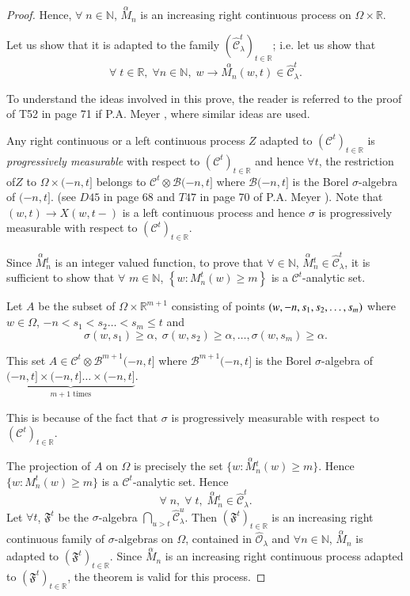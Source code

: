 \begin{proof}
Hence, $\forall \; n \in \mathbb{N}$, $\overset{\alpha}{M}_n$ is an
increasing right continuous process on $\Omega \times \mathbb{R}$. 

Let us show that it is adapted to the family
$(\hat{\mathscr{C}}^t_\lambda)_{t \in \mathbb{R}}$; i.e. let us show
that 
$$
\forall \; t \in \mathbb{R}, \; \forall n \in \mathbb{N}, \; w \to
\overset{\alpha}{M_n} (w,t) \in \hat{\mathscr{C}}^t_\lambda. 
$$

To understand the ideas involved in this prove, the reader is referred
to the proof of T52 in page 71 if P.A. Meyer \cite{key1}, where
similar ideas are used. 

Any right continuous or a left continuous process $Z$ adapted to\break
$(\mathscr{C}^t)_{t \in \mathbb{R}}$ is {\em progressively measurable}
with respect to $(\mathscr{C}^t)_{t \in \mathbb{R}}$ and hence
$\forall t$, the restriction of\pageoriginale $Z$ to $\Omega \times
(-n ,t]$ belongs to $\mathscr{C}^t \otimes \mathscr{B} (-n,t]$ where
  $\mathscr{B}(-n,t]$ is the Borel $\sigma$-algebra of $(-n,t]$. (see
$D45$ in page 68 and $T47$ in page 70 of P.A. Meyer \cite{key1}). Note
that $(w,t) \to X(w,t-)$ is a left continuous process and hence
$\sigma$ is progressively measurable with respect to
$(\mathscr{C}^t)_{t \in \mathbb{R}}$. 

Since $\overset{\alpha}{M} {}^t_n$ is an integer valued function, to
prove that $\forall \in \mathbb{N}$, $\overset{\alpha}{M}{}^t_n \in
\hat{\mathscr{C}}^t_\lambda $, it is sufficient to show that $\forall$
$m \in \mathbb{N}$, $\left\{ w: M^t_n (w) \geq m\right\}$ is a
$\mathscr{C}^t$-analytic set.

Let $A$ be the subset of $\Omega \times \mathbb{R}^{m+1}$ consisting
of points $(w, -n, s_1, s_2,\break\ldots,s_m)$ where $w \in \Omega$, $-n
< s_1 < s_2 \ldots  < s_m \leq t$ and 
$$
\sigma (w, s_1) \geq \alpha, \; \sigma (w, s_2) \geq \alpha, \ldots ,
\sigma (w , s_m) \geq \alpha. 
$$ 

This set $A \in \mathscr{C}^t \otimes \mathscr{B}^{m+1}(-n,t]$  where
$\mathscr{B}^{m+1} (-n,t] $ is the Borel $\sigma$-algebra of
$\underset{m+1 \text{ times}}{\underbrace{(-n,t] \times (-n,t] \ldots
\times (-n, t]}}$.  

This is because of the fact that $\sigma$ is progressively measurable
with respect to $(\mathscr{C}^t)_{t \in \mathbb{R}}$. 

The projection of $A$ on $\Omega$ is precisely the set $\{w:
\overset{\alpha}{M} {}^t_n (w) \geq m\}$. Hence $\{w: M^t_n (w) \geq
m\}$ is a $\mathscr{C}^t$-analytic set. Hence
$$
\forall \; n, \; \forall \; t, \; \overset{\alpha}{M}{}^t_n \in
\hat{\mathscr{C}}^t_\lambda. 
$$
Let $\forall t$, $\mathfrak{F}^t$ be the $\sigma$-algebra
$\bigcap\limits_{u>t} \hat{\mathscr{C}}^u_\lambda$. Then
$(\mathfrak{F}^t)_{t \in \mathbb{R}}$ is an increasing right
continuous family of $\sigma$-algebras on $\Omega$, contained in
$\hat{\mathscr{O}}_\lambda$ and $\forall n \in \mathbb{N}$,
$\overset{\alpha}{M}{}_n$ is adapted to $(\mathfrak{F}^t)_{t \in
  \mathbb{R}}$. Since $\overset{\alpha}{M}{}_n$ is an increasing right
continuous process adapted to $(\mathfrak{F}^t)_{t \in \mathbb{R}}$,
the theorem is valid for this process.


\end{proof}
